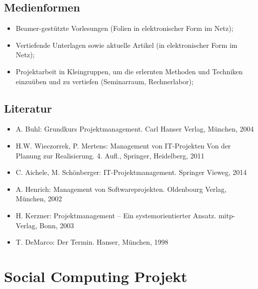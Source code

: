 \hypertarget{medienformenpathlabelmi-2017modulbeschreibungen-bachelorba_projektmanagement}{%
\section*{Medienformen\label{/mi-2017/modulbeschreibungen-bachelor/BA_Projektmanagement}}\label{medienformenpathlabelmi-2017modulbeschreibungen-bachelorba_projektmanagement}}

\begin{itemize}
\tightlist
\item
  Beamer-gestützte Vorlesungen (Folien in elektronischer Form im Netz);
\item
  Vertiefende Unterlagen sowie aktuelle Artikel (in elektronischer Form
  im Netz);
\item
  Projektarbeit in Kleingruppen, um die erlernten Methoden und Techniken
  einzuüben und zu vertiefen (Seminarraum, Rechnerlabor);
\end{itemize}

\hypertarget{literaturpathlabelmi-2017modulbeschreibungen-bachelorba_projektmanagement}{%
\section*{Literatur\label{/mi-2017/modulbeschreibungen-bachelor/BA_Projektmanagement}}\label{literaturpathlabelmi-2017modulbeschreibungen-bachelorba_projektmanagement}}

\begin{itemize}
\tightlist
\item
  A. Buhl: Grundkurs Projektmanagement. Carl Hanser Verlag, München,
  2004
\item
  H.W. Wieczorrek, P. Mertens: Management von IT-Projekten Von der
  Planung zur Realisierung. 4. Aufl., Springer, Heidelberg, 2011
\item
  C. Aichele, M. Schönberger: IT-Projektmanagement. Springer Vieweg,
  2014
\item
  A. Henrich: Management von Softwareprojekten. Oldenbourg Verlag,
  München, 2002
\item
  H. Kerzner: Projektmanagement -- Ein systemorientierter Ansatz.
  mitp-Verlag, Bonn, 2003
\item
  T. DeMarco: Der Termin. Hanser, München, 1998
\end{itemize}

\hypertarget{social-computing-projektpathlabelmi-2017modulbeschreibungen-bachelorba_sc_projekt}{%
\chapter{Social Computing
Projekt\label{/mi-2017/modulbeschreibungen-bachelor/BA_SC_Projekt}}\label{social-computing-projektpathlabelmi-2017modulbeschreibungen-bachelorba_sc_projekt}}

